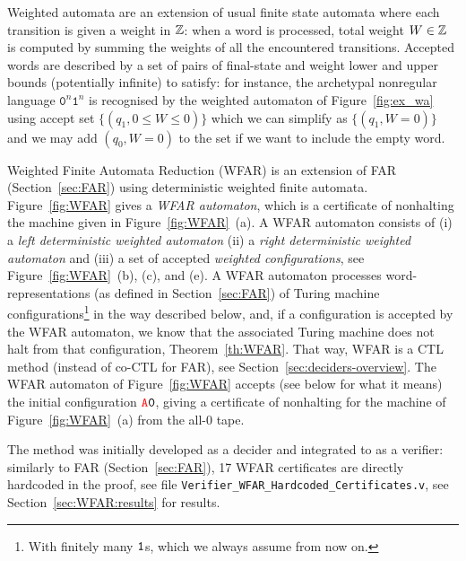 Weighted automata are an extension of usual finite state automata where each transition is given a weight in $\mathbb{Z}$: when a word is processed, total weight $W \in \mathbb{Z}$ is computed by summing the weights of all the encountered transitions. Accepted words are described by a set of pairs of final-state and weight lower and upper bounds (potentially infinite) to satisfy: for instance, the archetypal nonregular language $\texttt{0}^n \texttt{1}^n$ is recognised by the weighted automaton of Figure~\ref{fig:ex_wa} using accept set $\{(q_1,0 \leq W \leq 0)\}$ which we can simplify as $\{(q_1,W=0)\}$ and we may add $(q_0,W=0)$ to the set if we want to include the empty word.

Weighted Finite Automata Reduction (WFAR) is an extension of FAR (Section~\ref{sec:FAR}) using deterministic weighted finite automata. Figure~\ref{fig:WFAR} gives a \textit{WFAR automaton}, which is a certificate of nonhalting the machine given in Figure~\ref{fig:WFAR}~(a). A WFAR automaton consists of (i) a \textit{left deterministic weighted automaton} (ii) a \textit{right deterministic weighted automaton} and (iii) a set of accepted \textit{weighted configurations}, see Figure~\ref{fig:WFAR}~(b), (c), and (e).
A WFAR automaton processes word-representations (as defined in Section~\ref{sec:FAR}) of Turing machine configurations\footnote{With finitely many $\texttt{1}$s, which we always assume from now on.} in the way described below, and, if a configuration is accepted by the WFAR automaton, we know that the associated Turing machine does not halt from that configuration, Theorem~\ref{th:WFAR}. That way, WFAR is a CTL method (instead of co-CTL for FAR), see Section~\ref{sec:deciders-overview}. The WFAR automaton of Figure~\ref{fig:WFAR} accepts (see below for what it means) the initial configuration $\texttt{\stateA}\szero$, giving a certificate of nonhalting for the machine of Figure~\ref{fig:WFAR}~(a) from the all-0 tape.

The method was initially developed as a decider \cite{iijil1_2025_14914502} and integrated to \CoqBB as a verifier: similarly to FAR (Section~\ref{sec:FAR}), 17 WFAR certificates are directly hardcoded in the \Coq proof, see file \texttt{Verifier\_WFAR\_Hardcoded\_Certificates.v}, see Section~\ref{sec:WFAR:results} for results.

